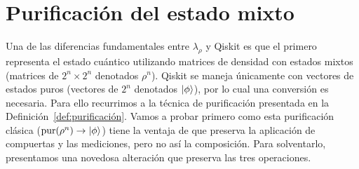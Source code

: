 



\section{Purificación del estado mixto}\label{sec:trad_pur}
Una de las diferencias fundamentales entre $\lambda_\rho$ y Qiskit es que el primero representa el estado cuántico utilizando matrices de densidad con estados mixtos (matrices de $2^n \times 2^n$ denotados $\rho^n$). Qiskit se maneja únicamente con vectores de estados puros (vectores de $2^n$ denotados $\ket{\phi}$), por lo cual una conversión es necesaria. Para ello recurrimos a la técnica de purificación presentada en la Definición~\ref{def:purificación}. Vamos a probar primero como esta purificación clásica ($\text{pur}(\rho^n)\rightarrow\ket{\phi}$) tiene la ventaja de que preserva la aplicación de compuertas y las mediciones, pero no así la composición. Para solventarlo, presentamos una novedosa alteración que preserva las tres operaciones.

